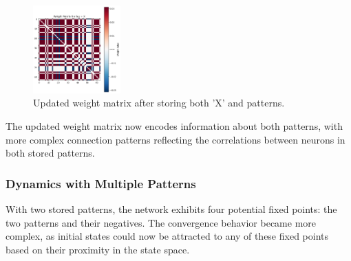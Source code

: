 \documentclass{article}
\begin{document}
\begin{figure}[H]
\centering
\includegraphics[width=0.3\textwidth]{Weight Matrix Smiley + X.png}
\caption{Updated weight matrix after storing both 'X' and \smiley{} patterns.}
\label{fig:weight_matrix2}
\end{figure}

The updated weight matrix now encodes information about both patterns, with more complex connection patterns reflecting the correlations between neurons in both stored patterns.


\subsubsection{Dynamics with Multiple Patterns}
With two stored patterns, the network exhibits four potential fixed points: the two patterns and their negatives. The convergence behavior became more complex, as initial states could now be attracted to any of these fixed points based on their proximity in the state space.
\end{document}
